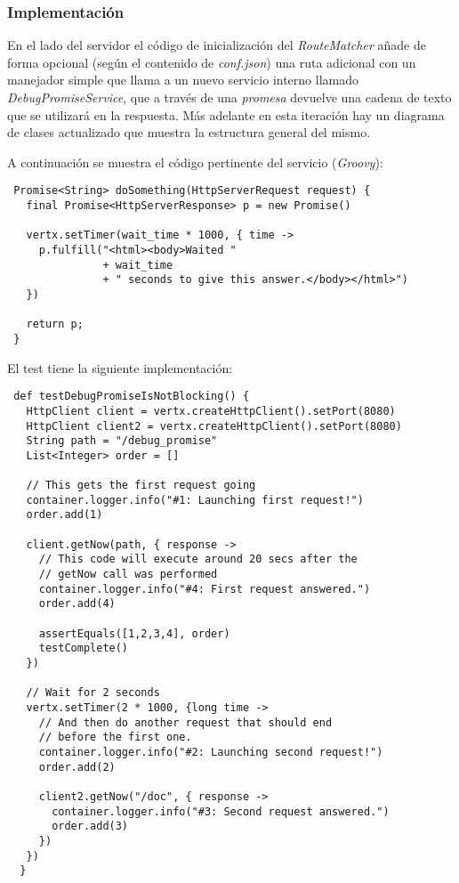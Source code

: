 \subsubsection{Implementación}

En el lado del servidor el código de inicialización del \emph{RouteMatcher} añade
de forma opcional (según el contenido de \emph{conf.json}) una ruta adicional 
con un manejador simple que llama a un nuevo servicio interno llamado
\emph{DebugPromiseService}, que a través de una \emph{promesa} devuelve una
cadena de texto que se utilizará en la respuesta. Más adelante en esta iteración
hay un diagrama de clases actualizado que muestra la estructura general del mismo.

A continuación se muestra el código pertinente del servicio (\emph{Groovy}):

\begin{verbatim}
 Promise<String> doSomething(HttpServerRequest request) {
   final Promise<HttpServerResponse> p = new Promise()

   vertx.setTimer(wait_time * 1000, { time ->
     p.fulfill("<html><body>Waited " 
               + wait_time 
               + " seconds to give this answer.</body></html>")
   })

   return p;
 }
\end{verbatim}

El test tiene la siguiente implementación:

\begin{verbatim}
 def testDebugPromiseIsNotBlocking() {
   HttpClient client = vertx.createHttpClient().setPort(8080)
   HttpClient client2 = vertx.createHttpClient().setPort(8080)
   String path = "/debug_promise"
   List<Integer> order = []

   // This gets the first request going
   container.logger.info("#1: Launching first request!")
   order.add(1)

   client.getNow(path, { response ->
     // This code will execute around 20 secs after the 
     // getNow call was performed
     container.logger.info("#4: First request answered.")
     order.add(4)

     assertEquals([1,2,3,4], order)
     testComplete()
   })

   // Wait for 2 seconds
   vertx.setTimer(2 * 1000, {long time ->
     // And then do another request that should end 
     // before the first one.
     container.logger.info("#2: Launching second request!")
     order.add(2)

     client2.getNow("/doc", { response ->
       container.logger.info("#3: Second request answered.")
       order.add(3)
     })
   })
  }
\end{verbatim}

